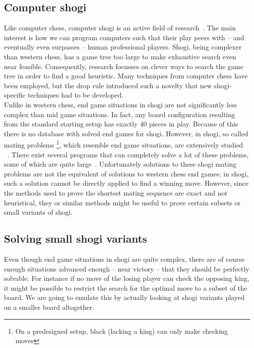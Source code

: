 \documentclass{article}
\begin{document}
\subsection{Computer shogi}
Like computer chess, computer shogi is an active field of research~\cite{iida2002computer}. The main interest is how we can program computers 
such that their play peers with -- and eventually even surpasses -- human professional players. Shogi, being complexer
than western chess, has a game tree too large to make exhaustive search even near feasible. Consequently, research
focusses on clever ways to search the game tree in order to find a good heuristic. Many techniques from computer chess
have been employed, but the drop rule introduced such a novelty that new shogi-specific techniques had to be developed.\\

Unlike in western chess, end game situations
in shogi are not significantly less complex than mid game situations. In fact, any board configuration resulting from the standard
starting setup has exactly 40 pieces in play. Because of this there is no database with solved end games for shogi.
However, in shogi, so called mating problems \footnote{On a predesigned setup, black (lacking a king) can only make checking moves},
which resemble end game situations, are extensively studied ~\cite{grimbergen1999survey}. There exist several
programs that can completely solve a lot of these problems, some of which are quite large~\cite{seo2001pn}. Unfortunately solutions to these shogi
mating problems are not the equivalent of solutions to western chess end games; in shogi, such a solution cannot be directly applied to find a winning move.
However, since the methods used to prove the shortest mating sequence are exact and not heuristical, they or similar methods might be useful to prove
certain subsets or small variants of shogi.\\

\subsection{Solving small shogi variants}
Even though end game situations in shogi are quite complex, there are of course enough situations advanced enough -- near victory -- that they
should be perfectly solvable. For instance if no move of the losing player can check the opposing king, it might be possible to restrict the search
for the optimal move to a subset of the board. We are going to emulate this by actually looking at shogi variants played on a smaller board
altogether.
\end{document}
